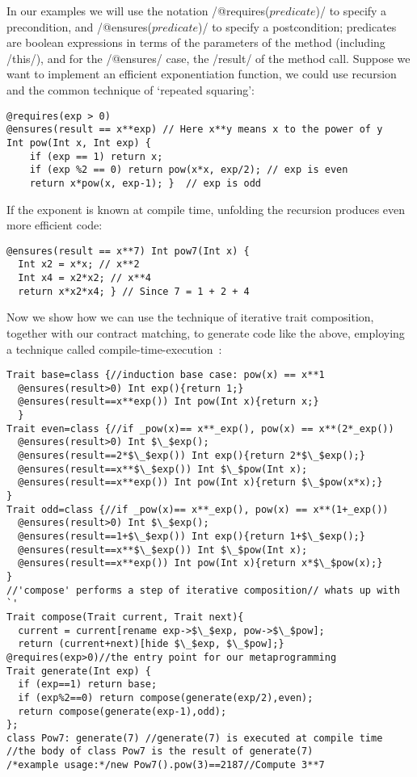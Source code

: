 In our examples we will use the notation /@requires($predicate$)/ 
to specify a precondition, and /@ensures($predicate$)/ 
to specify a postcondition; predicates are boolean expressions
in terms of the parameters of the method (including /this/), and for the /@ensures/ case, the /result/ of the method call.
Suppose we want to implement an efficient exponentiation function, we could use recursion and the common technique of `repeated squaring':
\vspace{-1ex}
\begin{lstlisting}
@requires(exp > 0)
@ensures(result == x**exp) // Here x**y means x to the power of y
Int pow(Int x, Int exp) {
	if (exp == 1) return x;
	if (exp %2 == 0) return pow(x*x, exp/2); // exp is even
	return x*pow(x, exp-1); }  // exp is odd
\end{lstlisting}
If the exponent is known at compile time,
unfolding the recursion produces even more efficient code:
\vspace{-1ex}
\begin{lstlisting}[firstnumber=7]
@ensures(result == x**7) Int pow7(Int x) { 
  Int x2 = x*x; // x**2
  Int x4 = x2*x2; // x**4
  return x*x2*x4; } // Since 7 = 1 + 2 + 4
\end{lstlisting}
\vspace{-1ex}
Now we show how we can use the technique of iterative trait composition, together with our contract matching, to generate code like the above, employing a technique called compile-time-execution~\cite{sheard2002template}:
\vspace{-1ex}
\begin{lstlisting}[firstnumber=11]
Trait base=class {//induction base case: pow(x) == x**1
  @ensures(result>0) Int exp(){return 1;}  
  @ensures(result==x**exp()) Int pow(Int x){return x;}
  }
Trait even=class {//if _pow(x)== x**_exp(), pow(x) == x**(2*_exp())
  @ensures(result>0) Int $\_$exp();
  @ensures(result==2*$\_$exp()) Int exp(){return 2*$\_$exp();}
  @ensures(result==x**$\_$exp()) Int $\_$pow(Int x);
  @ensures(result==x**exp()) Int pow(Int x){return $\_$pow(x*x);}
}
Trait odd=class {//if _pow(x)== x**_exp(), pow(x) == x**(1+_exp())
  @ensures(result>0) Int $\_$exp();
  @ensures(result==1+$\_$exp()) Int exp(){return 1+$\_$exp();}
  @ensures(result==x**$\_$exp()) Int $\_$pow(Int x);
  @ensures(result==x**exp()) Int pow(Int x){return x*$\_$pow(x);}
}
//'compose' performs a step of iterative composition// whats up with `'
Trait compose(Trait current, Trait next){
  current = current[rename exp->$\_$exp, pow->$\_$pow];
  return (current+next)[hide $\_$exp, $\_$pow];}
@requires(exp>0)//the entry point for our metaprogramming
Trait generate(Int exp) {
  if (exp==1) return base;
  if (exp%2==0) return compose(generate(exp/2),even);
  return compose(generate(exp-1),odd);
};
class Pow7: generate(7) //generate(7) is executed at compile time
//the body of class Pow7 is the result of generate(7)
/*example usage:*/new Pow7().pow(3)==2187//Compute 3**7
\end{lstlisting}
\vspace{-1ex}